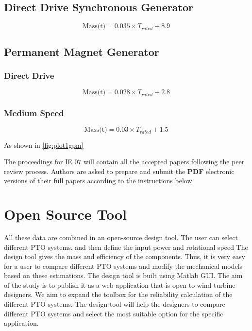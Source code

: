 \documentclass{article}\usepackage{graphicx, color}
\begin{document}
\subsection{Direct Drive Synchronous Generator}

\begin{equation}
  \text{Mass(t)} = 0.035 \times {T_{rated}} + 8.9
\end{equation}

\subsection{Permanent Magnet Generator}

\subsubsection{Direct Drive}

\begin{equation}
  \text{Mass(t)} = 0.028 \times {T_{rated}} + 2.8
\end{equation}


\subsubsection{Medium Speed}

\begin{equation}
  \text{Mass(t)} = 0.03 \times {T_{rated}} + 1.5
\end{equation}

As shown in \autoref{fig:plot1gpm}

The proceedings for IE 07 will contain all the accepted
papers following the peer review process. Authors are
asked to prepare and submit the {\bf PDF} electronic versions
of their full papers according to the instructions below.

\section{Open Source Tool}
All these data are combined in an open-source design tool. The user can select different PTO systems, and then define the input power and rotational speed The design tool gives the mass and efficiency of the components. Thus, it is very easy for a user to compare different PTO systems and modify the mechanical models based on these estimations. The design tool is built using Matlab GUI. The aim of the study is to publish it as a web application that is open to wind turbine designers. We aim to expand the toolbox for the reliability calculation of the different PTO systems. The design tool will help the designers to compare different PTO systems and select the most suitable option for the specific application.
\end{document}
